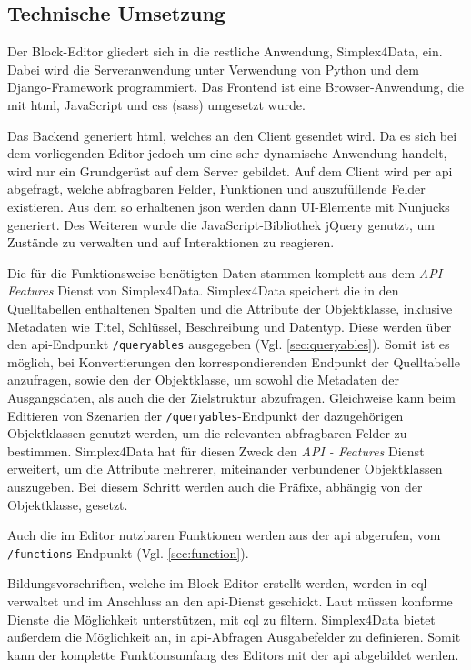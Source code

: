 \subsection{Technische Umsetzung}
Der Block-Editor gliedert sich in die restliche Anwendung, Simplex4Data, ein. Dabei wird die Serveranwendung unter Verwendung von Python und dem Django-Framework \parencite{djangosoftwarefoundationDjango} programmiert. Das Frontend ist eine Browser-Anwendung, die mit \ac{html}, JavaScript und \ac{css} (\ac{sass}) umgesetzt wurde.

Das Backend generiert \ac{html}, welches an den Client gesendet wird. Da es sich bei dem vorliegenden Editor jedoch um eine sehr dynamische Anwendung handelt, wird nur ein Grundgerüst auf dem Server gebildet. Auf dem Client wird per \ac{api} abgefragt, welche abfragbaren Felder, Funktionen und auszufüllende Felder existieren. Aus dem so erhaltenen \ac{json} werden dann UI-Elemente mit Nunjucks \parencite{mozillaNunjucks} generiert. Des Weiteren wurde die JavaScript-Bibliothek jQuery \parencite{openjsfoundationJQuery} genutzt, um Zustände zu verwalten und auf Interaktionen zu reagieren.

Die für die Funktionsweise benötigten Daten stammen komplett aus dem \textit{API - Features} Dienst \parencite{ogcAPI} von Simplex4Data. Simplex4Data speichert die in den Quelltabellen enthaltenen Spalten und die Attribute der Objektklasse, inklusive Metadaten wie Titel, Schlüssel, Beschreibung und Datentyp. Diese werden über den \ac{api}-Endpunkt \texttt{/queryables} ausgegeben (Vgl. \ref{sec:queryables}). Somit ist es möglich, bei Konvertierungen den korrespondierenden Endpunkt der Quelltabelle anzufragen, sowie den der Objektklasse, um sowohl die Metadaten der Ausgangsdaten, als auch die der Zielstruktur abzufragen. Gleichweise kann beim Editieren von Szenarien der \texttt{/queryables}-Endpunkt der dazugehörigen Objektklassen genutzt werden, um die relevanten abfragbaren Felder zu bestimmen. Simplex4Data hat für diesen Zweck den \textit{API - Features} Dienst erweitert, um die Attribute mehrerer, miteinander verbundener Objektklassen auszugeben. Bei diesem Schritt werden auch die Präfixe, abhängig von der Objektklasse, gesetzt.

Auch die im Editor nutzbaren Funktionen werden aus der \ac{api} abgerufen, vom \texttt{/functions}-Endpunkt (Vgl. \ref{sec:function}).

Bildungsvorschriften, welche im Block-Editor erstellt werden, werden in \ac{cql} verwaltet und im Anschluss an den \ac{api}-Dienst geschickt. Laut  müssen konforme Dienste die Möglichkeit unterstützen, mit \ac{cql} zu filtern. Simplex4Data bietet außerdem die Möglichkeit an, in \ac{api}-Abfragen Ausgabefelder zu definieren. Somit kann der komplette Funktionsumfang des Editors mit der \ac{api} abgebildet werden.

